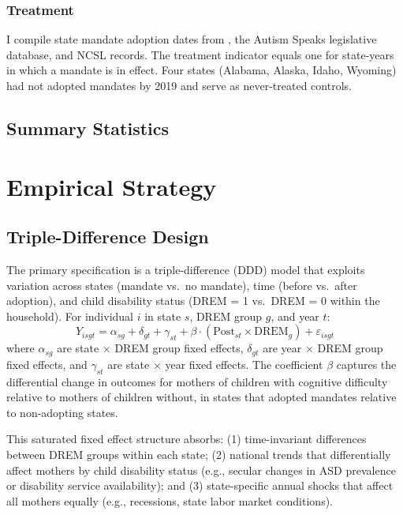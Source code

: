 \documentclass[12pt]{article}
\begin{document}
\subsubsection*{Treatment}  I compile state mandate adoption dates from \citet{chatterji2015}, the Autism Speaks legislative database, and NCSL records. The treatment indicator equals one for state-years in which a mandate is in effect. Four states (Alabama, Alaska, Idaho, Wyoming) had not adopted mandates by 2019 and serve as never-treated controls.

\subsection{Summary Statistics}




\section{Empirical Strategy}

\subsection{Triple-Difference Design}

The primary specification is a triple-difference (DDD) model that exploits variation across states (mandate vs.\ no mandate), time (before vs.\ after adoption), and child disability status (DREM = 1 vs.\ DREM = 0 within the household). For individual $i$ in state $s$, DREM group $g$, and year $t$:
\begin{equation}
Y_{isgt} = \alpha_{sg} + \delta_{gt} + \gamma_{st} + \beta \cdot (\text{Post}_{st} \times \text{DREM}_g) + \varepsilon_{isgt}
\label{eq:ddd}
\end{equation}
where $\alpha_{sg}$ are state $\times$ DREM group fixed effects, $\delta_{gt}$ are year $\times$ DREM group fixed effects, and $\gamma_{st}$ are state $\times$ year fixed effects. The coefficient $\beta$ captures the differential change in outcomes for mothers of children with cognitive difficulty relative to mothers of children without, in states that adopted mandates relative to non-adopting states.

This saturated fixed effect structure absorbs: (1) time-invariant differences between DREM groups within each state; (2) national trends that differentially affect mothers by child disability status (e.g., secular changes in ASD prevalence or disability service availability); and (3) state-specific annual shocks that affect all mothers equally (e.g., recessions, state labor market conditions).
\end{document}
